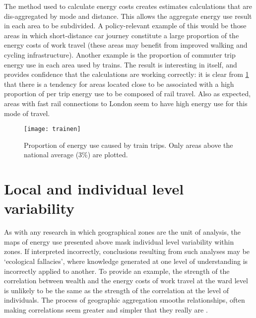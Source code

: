 The method used to calculate energy costs creates estimates
calculations that are dis-aggregated by mode and distance. This allows the
aggregate energy use result in each area to be subdivided.
A policy-relevant example of this would be those areas in which
short-distance car journey constitute
a large proportion of the energy costs of work travel (these areas
may benefit from improved walking and cycling infrastructure). Another example
is the proportion of commuter trip energy use
in each area used by trains. The result is interesting in itself, and
provides confidence that the calculations are working correctly:
it is clear from \cref{ftrainen} that there is a tendency for
areas located close to be associated with a high proportion of per trip energy
use to be composed of rail travel. Also as expected, areas with fast rail
connections to London seem to have high energy use for this mode of travel.

\begin{figure}[htbp]
\begin{center}
    \texttt{[image: trainen]}  \end{center}
  \caption[Proportion of energy use caused by train trips]
  {Proportion of energy use caused by train trips. Only areas
  above the national average (3\%) are plotted.}
 \label{ftrainen}
\end{figure}

\section{Local and individual level variability} \label{sindvar}

As with any research in which geographical zones are the unit of analysis,
the maps of energy use presented above mask individual level variability within
zones. If interpreted incorrectly, conclusions resulting from such analyses
may be `ecological fallacies', where knowledge generated
at one level of understanding is incorrectly applied to another.
To provide an example, the strength of the correlation between wealth and the energy
costs of work travel at the ward level is unlikely to be the same as the
strength of the correlation at the level of individuals. The process of
geographic aggregation smooths relationships, often making correlations seem
greater and simpler that they really are \citep{Openshaw1983}. 

